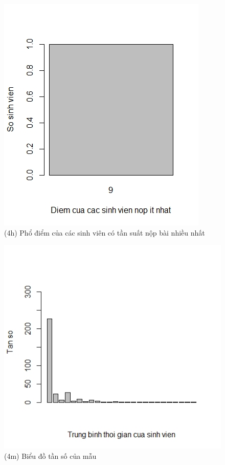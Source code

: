 \documentclass[a4paper]{article}
\theoremstyle{definition}
\begin{document}
\begin{figure}[!ht]
    \centering
    \includegraphics[scale=0.4]{Pics/q4h-file1.jpeg}
    \caption{(4h) Phổ điểm của các sinh viên có tần suất nộp bài nhiều nhất}
    \label{fig:my_label}
\end{figure}
\begin{figure}[!ht]
    \centering
    \includegraphics[scale=0.4]{Pics/q4m-file1.jpeg}
    \caption{(4m) Biểu đồ tần số của mẫu}
    \label{fig:my_label}
\end{figure}
\end{document}
